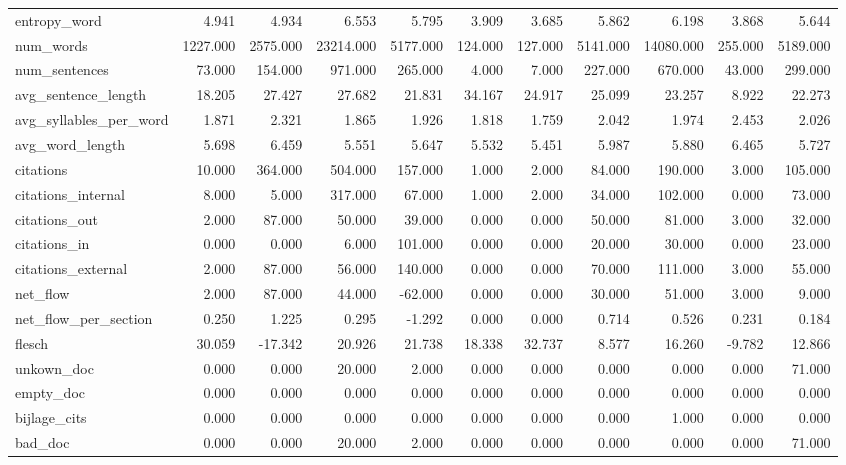 \begin{tabular}{lrrrrrrrrrr}
\cline{1-11}
entropy\_word & 4.941 & 4.934 & 6.553 & 5.795 & 3.909 & 3.685 & 5.862 & 6.198 & 3.868 & 5.644 \\
\cline{1-11}
num\_words & 1227.000 & 2575.000 & 23214.000 & 5177.000 & 124.000 & 127.000 & 5141.000 & 14080.000 & 255.000 & 5189.000 \\
\cline{1-11}
num\_sentences & 73.000 & 154.000 & 971.000 & 265.000 & 4.000 & 7.000 & 227.000 & 670.000 & 43.000 & 299.000 \\
\cline{1-11}
avg\_sentence\_length & 18.205 & 27.427 & 27.682 & 21.831 & 34.167 & 24.917 & 25.099 & 23.257 & 8.922 & 22.273 \\
\cline{1-11}
avg\_syllables\_per\_word & 1.871 & 2.321 & 1.865 & 1.926 & 1.818 & 1.759 & 2.042 & 1.974 & 2.453 & 2.026 \\
\cline{1-11}
avg\_word\_length & 5.698 & 6.459 & 5.551 & 5.647 & 5.532 & 5.451 & 5.987 & 5.880 & 6.465 & 5.727 \\
\cline{1-11}
citations & 10.000 & 364.000 & 504.000 & 157.000 & 1.000 & 2.000 & 84.000 & 190.000 & 3.000 & 105.000 \\
\cline{1-11}
citations\_internal & 8.000 & 5.000 & 317.000 & 67.000 & 1.000 & 2.000 & 34.000 & 102.000 & 0.000 & 73.000 \\
\cline{1-11}
citations\_out & 2.000 & 87.000 & 50.000 & 39.000 & 0.000 & 0.000 & 50.000 & 81.000 & 3.000 & 32.000 \\
\cline{1-11}
citations\_in & 0.000 & 0.000 & 6.000 & 101.000 & 0.000 & 0.000 & 20.000 & 30.000 & 0.000 & 23.000 \\
\cline{1-11}
citations\_external & 2.000 & 87.000 & 56.000 & 140.000 & 0.000 & 0.000 & 70.000 & 111.000 & 3.000 & 55.000 \\
\cline{1-11}
net\_flow & 2.000 & 87.000 & 44.000 & -62.000 & 0.000 & 0.000 & 30.000 & 51.000 & 3.000 & 9.000 \\
\cline{1-11}
net\_flow\_per\_section & 0.250 & 1.225 & 0.295 & -1.292 & 0.000 & 0.000 & 0.714 & 0.526 & 0.231 & 0.184 \\
\cline{1-11}
flesch & 30.059 & -17.342 & 20.926 & 21.738 & 18.338 & 32.737 & 8.577 & 16.260 & -9.782 & 12.866 \\
\cline{1-11}
unkown\_doc & 0.000 & 0.000 & 20.000 & 2.000 & 0.000 & 0.000 & 0.000 & 0.000 & 0.000 & 71.000 \\
\cline{1-11}
empty\_doc & 0.000 & 0.000 & 0.000 & 0.000 & 0.000 & 0.000 & 0.000 & 0.000 & 0.000 & 0.000 \\
\cline{1-11}
bijlage\_cits & 0.000 & 0.000 & 0.000 & 0.000 & 0.000 & 0.000 & 0.000 & 1.000 & 0.000 & 0.000 \\
\cline{1-11}
bad\_doc & 0.000 & 0.000 & 20.000 & 2.000 & 0.000 & 0.000 & 0.000 & 0.000 & 0.000 & 71.000 \\
\cline{1-11}
\bottomrule
\end{tabular}
